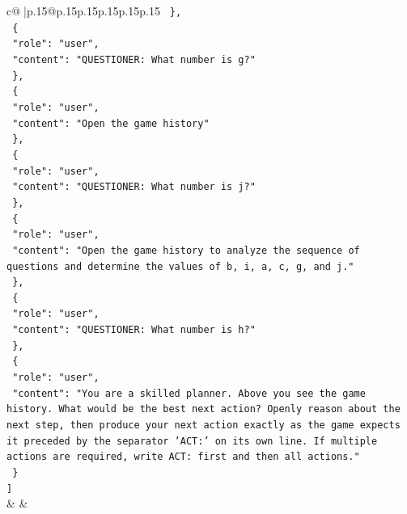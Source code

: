 \documentclass{article}
\begin{document}
{\begin{supertabular}{c@{$\;$}|p{.15\linewidth}@{}p{.15\linewidth}p{.15\linewidth}p{.15\linewidth}p{.15\linewidth}p{.15\linewidth}}
{{{\texttt{  \},} \\
\texttt{  \{} \\
\texttt{    "role": "user",} \\
\texttt{    "content": "QUESTIONER: What number is g?"} \\
\texttt{  \},} \\
\texttt{  \{} \\
\texttt{    "role": "user",} \\
\texttt{    "content": "Open the game history"} \\
\texttt{  \},} \\
\texttt{  \{} \\
\texttt{    "role": "user",} \\
\texttt{    "content": "QUESTIONER: What number is j?"} \\
\texttt{  \},} \\
\texttt{  \{} \\
\texttt{    "role": "user",} \\
\texttt{    "content": "Open the game history to analyze the sequence of questions and determine the values of b, i, a, c, g, and j."} \\
\texttt{  \},} \\
\texttt{  \{} \\
\texttt{    "role": "user",} \\
\texttt{    "content": "QUESTIONER: What number is h?"} \\
\texttt{  \},} \\
\texttt{  \{} \\
\texttt{    "role": "user",} \\
\texttt{    "content": "You are a skilled planner. Above you see the game history. What would be the best next action? Openly reason about the next step, then produce your next action exactly as the game expects it preceded by the separator 'ACT:' on its own line. If multiple actions are required, write ACT: first and then all actions."} \\
\texttt{  \}} \\
\texttt{{]}} \\
            }
        }
    }
    & & \\ \\


\end{supertabular}}
\end{document}
